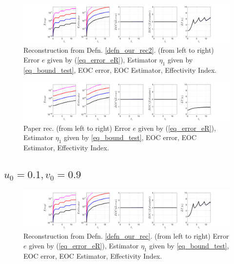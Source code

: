 \documentclass[12pt,a4paper]{article}
\numberwithin{equation}{section}
\theoremstyle{definition}
\begin{document}
\begin{figure}[H]
	\hspace{-3cm}
	\includegraphics[scale=0.55]{fig_LeapFrogplots_1x5_sin_IC_harmonic_order_2_u0_v10_rec2}	
	\caption{Reconstruction from Defn. \ref{defn_our_rec2}. (from left to right) Error $e$ given by (\ref{eq_error_eR}), Estimator $\eta_1$ given by \ref{eq_bound_test}, EOC error, EOC Estimator, Effectivity Index.}
	\label{fig_all_in_one_our_rec_2_u0_v10}
\end{figure}

\begin{figure}[H]
	\hspace{-3cm}
	\includegraphics[scale=0.55]{fig_LeapFrogplots_1x5_sin_IC_harmonic_u0_v10_paperrec}	
	\caption{Paper rec. (from left to right) Error $e$ given by (\ref{eq_error_eR}), Estimator $\eta_1$ given by \ref{eq_bound_test}, EOC error, EOC Estimator, Effectivity Index.}
	\label{fig_all_in_one_paperrec_u0_v10}
\end{figure}

\subsection*{$u_0=0.1, v_0= 0.9$}

\begin{figure}[H]
	\hspace{-3cm}
	\includegraphics[scale=0.55]{fig_LeapFrogplots_1x5_sin_IC_harmonic_order_2_u1_v9_rec_george}	
	\caption{Reconstruction from Defn. \ref{defn_our_rec}. (from left to right) Error $e$ given by (\ref{eq_error_eR}), Estimator $\eta_1$ given by \ref{eq_bound_test},  EOC error, EOC Estimator, Effectivity Index.}
	\label{fig_all_in_one_our_rec_george_u1_v9}
\end{figure}
\end{document}
